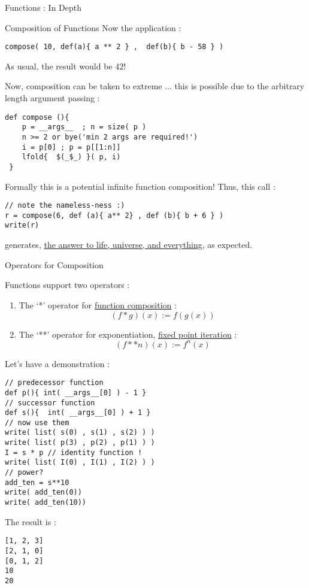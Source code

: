 \begin{section}{Functions : In Depth}
\begin{subsection}{Composition of Functions}
Now the application :

\begin{lstlisting}[style=JexlStyle]
 compose( 10, def(a){ a ** 2 } ,  def(b){ b - 58 } )
\end{lstlisting}
 
As usual, the result would be 42!

Now, composition can be taken to extreme ... this is possible due to the arbitrary length argument passing :

\begin{lstlisting}[style=JexlStyle]
def compose (){
    p = __args__  ; n = size( p ) 
    n >= 2 or bye('min 2 args are required!') 
    i = p[0] ; p = p[[1:n]]
    lfold{  $(_$_) }( p, i) 
 }
\end{lstlisting}
 
Formally this is a potential infinite function composition! Thus, this call :

\begin{lstlisting}[style=JexlStyle]
// note the nameless-ness :)
r = compose(6, def (a){ a** 2} , def (b){ b + 6 } )
write(r)
\end{lstlisting}

generates, \href{https://www.google.co.in/search?client=safari&rls=en&q=the+answer+to+life,+universe,+and+everything&ie=UTF-8&oe=UTF-8&gfe\_rd=cr&ei=hHDIVsv-BsGL8QedmLnwDg}{the answer to life, universe, and everything}, as expected.

\end{subsection}

\begin{subsection}{Operators for Composition}

Functions support two operators :
\begin{enumerate}
\item{ The `*' operator for \href{https://en.wikipedia.org/wiki/Function_composition}{function composition} :
   $$
   ( f * g) ( x ) := f ( g ( x ) )  
   $$
}
\item { The `**' operator for exponentiation, 
\href{https://en.wikipedia.org/wiki/Fixed-point\_iteration}{fixed point iteration}  : 
  $$
   ( f ** n ) (x) := f^n(x)     
  $$
}
\end{enumerate}
Let's have a demonstration :

\begin{lstlisting}[style=JexlStyle]
// predecessor function 
def p(){ int( __args__[0] ) - 1 }
// successor function 
def s(){  int( __args__[0] ) + 1 }
// now use them 
write( list( s(0) , s(1) , s(2) ) )
write( list( p(3) , p(2) , p(1) ) )
I = s * p // identity function !
write( list( I(0) , I(1) , I(2) ) )
// power?
add_ten = s**10 
write( add_ten(0))
write( add_ten(10))
\end{lstlisting}
The result is :
\begin{lstlisting}[style=all]
[1, 2, 3]
[2, 1, 0]
[0, 1, 2]
10
20
\end{lstlisting}


\end{subsection}
\end{section}
